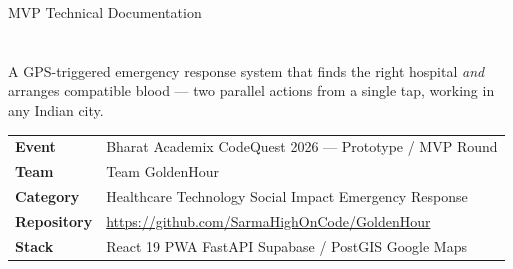 \documentclass[11pt]{article}
\begin{document}
\begin{titlepage}
\thispagestyle{empty}

\vspace*{6.5cm}

{\sffamily
\noindent\textcolor{ghSlate}{\large MVP \textbar{} Technical Documentation}\\[4pt]
\\[6pt]
\\[18pt]

\noindent\textcolor{ghInk}{\large A GPS-triggered emergency response system that finds the right
hospital \emph{and} arranges compatible blood --- two parallel actions from a single tap,
working in any Indian city.}
}

\vfill

\noindent
\begin{tabularx}{\textwidth}{@{}p{4.2cm}X@{}}
\textsf{\bfseries\color{ghSlate}Event} & \textsf{Bharat Academix CodeQuest 2026 --- Prototype / MVP Round} \\
\textsf{\bfseries\color{ghSlate}Team} & \textsf{Team GoldenHour} \\
\textsf{\bfseries\color{ghSlate}Category} & \textsf{Healthcare Technology \textbullet{} Social Impact \textbullet{} Emergency Response} \\
\textsf{\bfseries\color{ghSlate}Repository} & \textsf{\url{https://github.com/SarmaHighOnCode/GoldenHour}} \\
\textsf{\bfseries\color{ghSlate}Stack} & \textsf{React 19 PWA \textbullet{} FastAPI \textbullet{} Supabase / PostGIS \textbullet{} Google Maps} \\
\end{tabularx}

\vspace{0.8cm}
\noindent{\color{ghAmber}\rule{\textwidth}{1.2pt}}
\end{titlepage}
\end{document}
